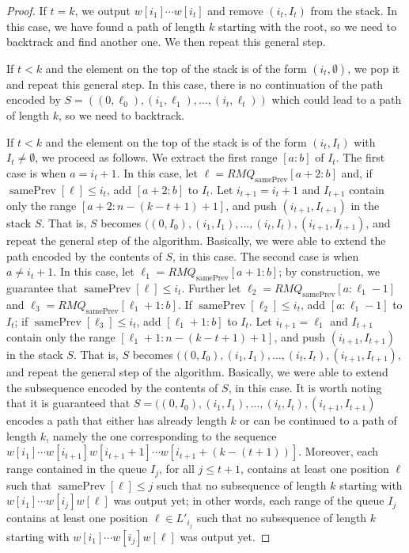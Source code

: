 \documentclass[runningheads,UKenglish,cleveref, autoref, thm-restate]{llncs}
\DeclareMathOperator{\prevArray}{samePrev}
\begin{document}
\begin{proof}
If $t=k$, we output $w[i_1]\cdots w[i_t]$ and remove $(i_t, I_t)$ from the stack. In this case, we have found a path of length $k$ starting with the root, so we need to backtrack and find another one. We then repeat this general step.  

If $t<k$ and the element on the top of the stack is of the form $(i_t,\emptyset)$, we pop it and repeat this general step. In this case, there is no continuation of the path encoded by $S=((0,\ell_0), (i_1, \ell_1), \ldots, (i_t, \ell_t))$ which could lead to a path of length $k$, so we need to backtrack.

If $t<k$ and the element on the top of the stack is of the form $(i_t,I_t)$ with $I_t\neq \emptyset$, we proceed as follows. We extract the first range $[a:b]$ of $I_t$. The first case is when $a=i_t+1$. In this case, let $\ell=RMQ_{\prevArray}[a+2:b]$ and, if $\prevArray[\ell]\leq i_t$, add $[a+2:b]$ to $I_t$. Let $i_{t+1}=i_t+1$ and $I_{t+1}$ contain only the range $[a+2:n-(k-t+1)+1]$, and push $(i_{t+1},I_{t+1})$ in the stack $S$. That is, $S$ becomes $((0,I_0), (i_1, I_1), \ldots, (i_t,I_t), (i_{t+1}, I_{t+1})$, and repeat the general step of the algorithm. Basically, we were able to extend the path encoded by the contents of $S$, in this case. The second case is when $a\neq i_t+1$. In this case, let $\ell_1=RMQ_{\prevArray}[a+1:b]$; by construction, we guarantee that $\prevArray[\ell]\leq i_t$. Further let $\ell_2=RMQ_{\prevArray}[a:\ell_1-1]$ and $\ell_3=RMQ_{\prevArray}[\ell_1+1:b]$. If $\prevArray[\ell_2]\leq i_t$, add $[a:\ell_1-1]$ to $I_t$; if $\prevArray[\ell_3]\leq i_t$, add $[\ell_1+1:b]$ to $I_t$.  Let $i_{t+1}=\ell_1$ and $I_{t+1}$ contain only the range $[\ell_1+1:n-(k-t+1)+1]$, and push $(i_{t+1},I_{t+1})$ in the stack $S$. That is, $S$ becomes $((0,I_0), (i_1, I_1), \ldots, (i_t,I_t), (i_{t+1}, I_{t+1})$, and repeat the general step of the algorithm. Basically, we were able to extend the subsequence encoded by the contents of $S$, in this case. It is worth noting that it is guaranteed that $S=((0,I_0), (i_1, I_1), \ldots, (i_t,I_t), (i_{t+1}, I_{t+1})$ encodes a path that either has already length $k$ or can be continued to a path of length $k$, namely the one corresponding to the sequence $w[i_1] \cdots w[i_{t+1}] w[i_{t+1}+1]\cdots w[i_{t+1}+(k-(t+1))]$. Moreover, each range contained in the queue $I_j$, for all $j\leq t+1$, contains at least one position $\ell$ such that $\prevArray [\ell]\leq j$ such that no subsequence of length $k$ starting with $w[i_1] \cdots w[i_{j}]w[\ell]$ was output yet; in other words, each range of the queue $I_j$ contains at least one position $\ell\in L'_{i_j}$ such that no subsequence of length $k$ starting with $w[i_1] \cdots w[i_{j}]w[\ell]$ was output yet. 


\end{proof}
\end{document}
